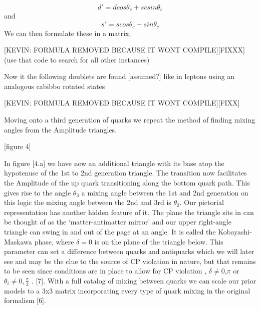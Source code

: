 \[d' =dcos\theta_c +scsin\theta_c\] and \[s'=scos\theta_c -sin\theta_c\]
We can then formulate these in a matrix,


[KEVIN: FORMULA REMOVED BECAUSE IT WONT COMPILE][FIXXX](use that code to search for all other instances)

Now it the following doublets are found [assumed?] like in leptons using an analogous cabibbo rotated states

[KEVIN: FORMULA REMOVED BECAUSE IT WONT COMPILE][FIXX]

Moving onto a third generation of quarks we repeat the method of finding mixing angles from the Amplitude triangles.

[figure 4]

In figure [4.a] we have now an additional triangle with its base atop the hypotenuse of the 1st to 2nd generation triangle. The transition now facilitates the Amplitude of the up quark transitioning along the bottom quark path. This gives rise to the angle $\theta_3$ a mixing angle between the 1st and 2nd generation on this logic the mixing angle between the 2nd and 3rd is $\theta_2$. Our pictorial representation has another hidden feature of it. The plane the triangle sits in can be thought of as the ‘matter-antimatter mirror’ and our upper right-angle triangle can swing in and out of the page at an angle. It is called the Kobayashi-Maskawa phase, where $\delta=0$ is on the plane of the triangle below. This parameter can set a difference between quarks and antiquarks which we will later see and may be the clue to the source of CP violation in nature, but that remains to be seen since  conditions are in place to allow for CP violation , $\delta\neq0$,$\pi$ or $\theta_i\neq0,\frac{\pi}{2}$ .  [7].
With a full catalog of mixing between quarks we can scale our prior models to a 3x3 matrix incorporating every type of quark mixing in the original formalism [6]. 

